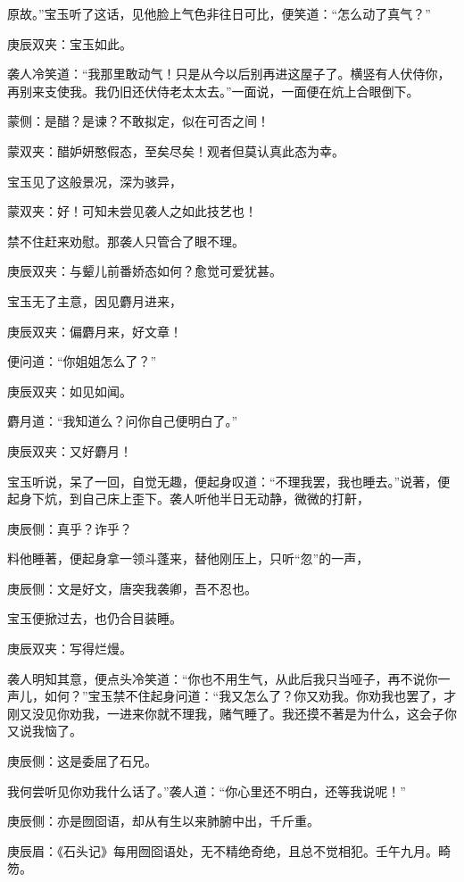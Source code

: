 \begin{parag}
原故。”宝玉听了这话，见他脸上气色非往日可比，便笑道：“怎么动了真气？”\begin{note}庚辰双夹：宝玉如此。\end{note}袭人冷笑道：“我那里敢动气！只是从今以后别再进这屋子了。横竖有人伏侍你，再别来支使我。我仍旧还伏侍老太太去。”一面说，一面便在炕上合眼倒下。\begin{note}蒙侧：是醋？是谏？不敢拟定，似在可否之间！\end{note}\begin{note}蒙双夹：醋妒妍憨假态，至矣尽矣！观者但莫认真此态为幸。\end{note}宝玉见了这般景况，深为骇异，\begin{note}蒙双夹：好！可知未尝见袭人之如此技艺也！\end{note}禁不住赶来劝慰。那袭人只管合了眼不理。\begin{note}庚辰双夹：与颦儿前番娇态如何？愈觉可爱犹甚。\end{note}宝玉无了主意，因见麝月进来，\begin{note}庚辰双夹：偏麝月来，好文章！\end{note}便问道：“你姐姐怎么了？”\begin{note}庚辰双夹：如见如闻。\end{note}麝月道：“我知道么？问你自己便明白了。”\begin{note}庚辰双夹：又好麝月！\end{note}宝玉听说，呆了一回，自觉无趣，便起身叹道：“不理我罢，我也睡去。”说著，便起身下炕，到自己床上歪下。袭人听他半日无动静，微微的打鼾，\begin{note}庚辰侧：真乎？诈乎？\end{note}料他睡著，便起身拿一领斗蓬来，替他刚压上，只听“忽”的一声，\begin{note}庚辰侧：文是好文，唐突我袭卿，吾不忍也。\end{note}宝玉便掀过去，也仍合目装睡。\begin{note}庚辰双夹：写得烂熳。\end{note}袭人明知其意，便点头冷笑道：“你也不用生气，从此后我只当哑子，再不说你一声儿，如何？”宝玉禁不住起身问道：“我又怎么了？你又劝我。你劝我也罢了，才刚又没见你劝我，一进来你就不理我，赌气睡了。我还摸不著是为什么，这会子你又说我恼了。\begin{note}庚辰侧：这是委屈了石兄。\end{note}我何尝听见你劝我什么话了。”袭人道：“你心里还不明白，还等我说呢！”\begin{note}庚辰侧：亦是囫囵语，却从有生以来肺腑中出，千斤重。\end{note}\begin{note}庚辰眉：《石头记》每用囫囵语处，无不精绝奇绝，且总不觉相犯。壬午九月。畸笏。\end{note}
\end{parag}


